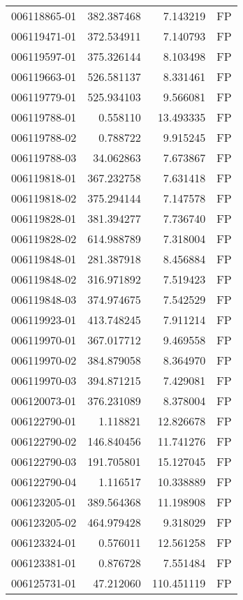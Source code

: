 \begin{tabular}{lrrl}
006118865-01 &  382.387468 &     7.143219 &   FP \\
006119471-01 &  372.534911 &     7.140793 &   FP \\
006119597-01 &  375.326144 &     8.103498 &   FP \\
006119663-01 &  526.581137 &     8.331461 &   FP \\
006119779-01 &  525.934103 &     9.566081 &   FP \\
006119788-01 &    0.558110 &    13.493335 &   FP \\
006119788-02 &    0.788722 &     9.915245 &   FP \\
006119788-03 &   34.062863 &     7.673867 &   FP \\
006119818-01 &  367.232758 &     7.631418 &   FP \\
006119818-02 &  375.294144 &     7.147578 &   FP \\
006119828-01 &  381.394277 &     7.736740 &   FP \\
006119828-02 &  614.988789 &     7.318004 &   FP \\
006119848-01 &  281.387918 &     8.456884 &   FP \\
006119848-02 &  316.971892 &     7.519423 &   FP \\
006119848-03 &  374.974675 &     7.542529 &   FP \\
006119923-01 &  413.748245 &     7.911214 &   FP \\
006119970-01 &  367.017712 &     9.469558 &   FP \\
006119970-02 &  384.879058 &     8.364970 &   FP \\
006119970-03 &  394.871215 &     7.429081 &   FP \\
006120073-01 &  376.231089 &     8.378004 &   FP \\
006122790-01 &    1.118821 &    12.826678 &   FP \\
006122790-02 &  146.840456 &    11.741276 &   FP \\
006122790-03 &  191.705801 &    15.127045 &   FP \\
006122790-04 &    1.116517 &    10.338889 &   FP \\
006123205-01 &  389.564368 &    11.198908 &   FP \\
006123205-02 &  464.979428 &     9.318029 &   FP \\
006123324-01 &    0.576011 &    12.561258 &   FP \\
006123381-01 &    0.876728 &     7.551484 &   FP \\
006125731-01 &   47.212060 &   110.451119 &   FP \\

\end{tabular}
